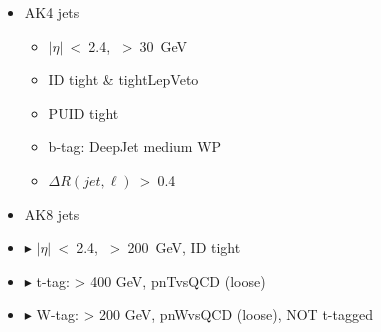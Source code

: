 {  \twoColumnsAsymOp
      {
        \begin{itemize}
          \small
        \item AK4 jets
          \begin{itemize}
            \small
          \item $|\eta|$~<~2.4, \pT~>~30~GeV
          \item ID tight \& tightLepVeto
          \item PUID tight
          \item b-tag: DeepJet medium WP
          \item $\Delta R(jet, \ell)$~>~0.4
          \end{itemize}
        \end{itemize}
      }
      {
        \begin{itemize}
          \small
        \item AK8 jets
        \item[] \textcolor{oxfordblue}{$\blacktriangleright$}
          $|\eta|$~<~2.4, \pT~>~200~GeV, ID tight
        \item[] \textcolor{oxfordblue}{$\blacktriangleright$} t-tag:
          \pT> 400 GeV, pnTvsQCD (loose)
        \item[] \textcolor{oxfordblue}{$\blacktriangleright$} W-tag:
          \pT> 200 GeV, pnWvsQCD (loose), NOT t-tagged
        \end{itemize}
      }
}

